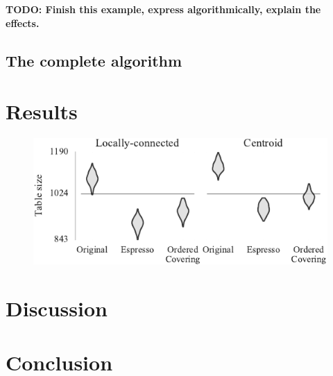 \documentclass[conference]{IEEEtran}
\begin{document}
  \textbf{TODO: Finish this example, express algorithmically, explain the effects.}

  \subsection{The complete algorithm}

  \section{Results}

\begin{figure}
  \centering
  \includegraphics{experiments/results_esp_and_oc}
\end{figure}

  \section{Discussion}

  \section{Conclusion}
\printbibliography
\end{document}
